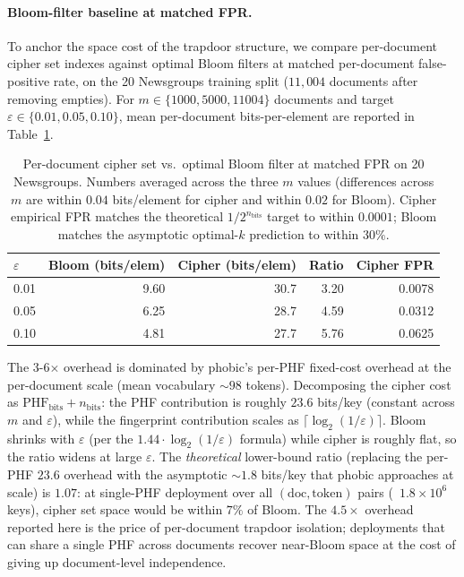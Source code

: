 \documentclass[11pt]{article}
\theoremstyle{definition}
\theoremstyle{plain}
\theoremstyle{remark}
\begin{document}
\paragraph{Bloom-filter baseline at matched FPR.}
To anchor the space cost of the trapdoor structure, we compare
per-document cipher set indexes against optimal Bloom filters at
matched per-document false-positive rate, on the 20 Newsgroups
training split ($11{,}004$ documents after removing empties).  For
$m \in \{1000, 5000, 11004\}$ documents and target
$\varepsilon \in \{0.01, 0.05, 0.10\}$, mean per-document
bits-per-element are reported in Table~\ref{tab:bloom-baseline}.

\begin{table}[ht]
\centering
\small
\begin{tabular}{lrrrr}
\toprule
$\varepsilon$ & Bloom (bits/elem) & Cipher (bits/elem) & Ratio & Cipher FPR \\
\midrule
0.01 & 9.60 & 30.7 & 3.20 & 0.0078 \\
0.05 & 6.25 & 28.7 & 4.59 & 0.0312 \\
0.10 & 4.81 & 27.7 & 5.76 & 0.0625 \\
\bottomrule
\end{tabular}
\caption{Per-document cipher set vs.\ optimal Bloom filter at matched
FPR on 20 Newsgroups.  Numbers averaged across the three $m$ values
(differences across $m$ are within $0.04$ bits/element for cipher and
within $0.02$ for Bloom).  Cipher empirical FPR matches the theoretical
$1/2^{n_{\mathrm{bits}}}$ target to within $0.0001$; Bloom matches
the asymptotic optimal-$k$ prediction to within $30\%$.}
\label{tab:bloom-baseline}
\end{table}

The 3-6$\times$ overhead is dominated by phobic's per-PHF fixed-cost
overhead at the per-document scale (mean vocabulary $\sim 98$
tokens).  Decomposing the cipher cost as $\mathrm{PHF}_{\mathrm{bits}}
+ n_{\mathrm{bits}}$: the PHF contribution is roughly $23.6$
bits/key (constant across $m$ and $\varepsilon$), while the
fingerprint contribution scales as $\lceil \log_2(1/\varepsilon) \rceil$.
Bloom shrinks with $\varepsilon$ (per the
$1.44 \cdot \log_2(1/\varepsilon)$ formula) while cipher is roughly
flat, so the ratio widens at large $\varepsilon$.  The
\emph{theoretical} lower-bound ratio (replacing the per-PHF
$23.6$ overhead with the asymptotic $\sim 1.8$ bits/key that phobic
approaches at scale) is $1.07$: at single-PHF deployment over all
$(\mathrm{doc}, \mathrm{token})$ pairs (~$1.8 \times 10^6$ keys),
cipher set space would be within $7\%$ of Bloom.  The $4.5\times$
overhead reported here is the price of per-document trapdoor
isolation; deployments that can share a single PHF across documents
recover near-Bloom space at the cost of giving up document-level
independence.
\end{document}
